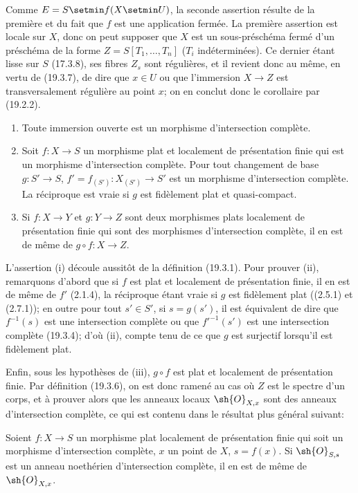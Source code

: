 Comme $E=S\setmin f(X\setmin U)$, la seconde assertion résulte de la première et du fait que $f$ est une application fermée. La première assertion est locale sur $X$, donc on peut supposer que $X$ est un sous-préschéma fermé d'un préschéma de la forme $Z=S[T_1,\ldots,T_n]$ ($T_i$ indéterminées). Ce dernier étant lisse sur $S$ (17.3.8), ses fibres $Z_s$ sont régulières, et il revient donc au même, en vertu de (19.3.7), de dire que $x\in U$ ou que l'immersion $X\to Z$ est transversalement régulière au point $x$; on en conclut donc le corollaire par (19.2.2).

\begin{proposition}[19.3.9]
\label{IV.19.3.9}
\begin{enumerate}
  \item[\textup{(i)}] Toute immersion ouverte est un morphisme d'intersection complète.
  \item[\textup{(ii)}] Soit $f:X\to S$ un morphisme plat et localement de présentation finie qui est un morphisme d'intersection complète. Pour tout changement de base $g:S'\to S$, $f'=f_{(S')}:X_{(S')}\to S'$ est un morphisme d'intersection complète. La réciproque est vraie si $g$ est fidèlement plat et quasi-compact.
  \item[\textup{(iii)}] Si $f:X\to Y$ et $g:Y\to Z$ sont deux morphismes plats localement de présentation finie qui sont des morphismes d'intersection complète, il en est de même de $g\circ f:X\to Z$.
\end{enumerate}
\end{proposition}

L'assertion (i) découle aussitôt de la définition (19.3.1). Pour prouver (ii), remarquons d'abord que si $f$ est plat et localement de présentation finie, il en est de
même de $f'$ (2.1.4), la réciproque étant vraie si $g$ est fidèlement plat ((2.5.1) et (2.7.1)); en outre pour tout $s'\in S'$, si $s=g(s')$, il est équivalent de dire que $f^{-1}(s)$ est une intersection complète ou que $f'^{-1}(s')$ est une intersection complète (19.3.4); d'où (ii), compte tenu de ce que $g$ est surjectif lorsqu'il est fidèlement plat.

Enfin, sous les hypothèses de (iii), $g\circ f$ est plat et localement de présentation finie. Par définition (19.3.6), on est donc ramené au cas où $Z$ est le spectre d'un corps, et à prouver alors que les anneaux locaux $\sh{O}_{X,x}$ sont des anneaux d'intersection complète, ce qui est contenu dans le résultat plus général suivant:

\begin{corollary}[19.3.10]
\label{IV.19.3.10}
Soient $f:X\to S$ un morphisme plat localement de présentation finie qui soit un morphisme d'intersection complète, $x$ un point de $X$, $s=f(x)$. Si $\sh{O}_{S,s}$ est un anneau noethérien d'intersection complète, il en est de même de $\sh{O}_{X,x}$.
\end{corollary}

